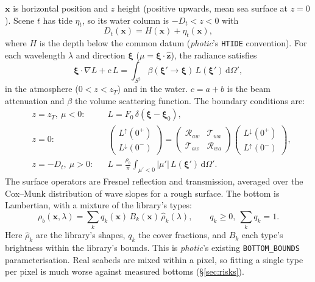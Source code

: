\documentclass[11pt]{article}
\numberwithin{equation}{section}
\newcommand{\bxi}{\boldsymbol{\xi}}
\newcommand{\bx}{\mathbf{x}}
\newcommand{\dd}{\,\mathrm{d}}
\newcommand{\code}[1]{\texttt{#1}}
\begin{document}
$\bx$ is horizontal position and $z$ height (positive upwards, mean sea surface at $z=0$).
Scene $t$ has tide $\eta_t$, so its water column is $-D_t < z < 0$ with
\begin{equation}
D_t(\bx) = H(\bx) + \eta_t(\bx),
\end{equation}
where $H$ is the depth below the common datum (\textit{photic}'s \code{HTIDE} convention). For
each wavelength $\lambda$ and direction $\bxi$ ($\mu = \bxi\cdot\hat{\mathbf z}$), the radiance
satisfies
\begin{equation}\label{eq:rte3d}
\bxi\cdot\nabla L + c\,L = \int_{S^2}\beta(\bxi'\!\to\bxi)\,L(\bxi')\dd\Omega',
\end{equation}
in the atmosphere ($0<z<z_T$) and in the water. $c = a+b$ is the beam attenuation and $\beta$
the volume scattering function. The boundary conditions are:
\begin{align}
&z=z_T,\ \mu<0: && L = F_0\,\delta(\bxi-\bxi_0), \label{eq:bc-toa}\\
&z=0: && \begin{pmatrix} L^{\uparrow}(0^+)\\ L^{\downarrow}(0^-)\end{pmatrix}
  = \begin{pmatrix} \mathcal{R}_{aw} & \mathcal{T}_{wa}\\ \mathcal{T}_{aw} & \mathcal{R}_{wa}\end{pmatrix}
    \begin{pmatrix} L^{\downarrow}(0^+)\\ L^{\uparrow}(0^-)\end{pmatrix}, \label{eq:bc-surf}\\
&z=-D_t,\ \mu>0: && L = \frac{\rho_b}{\pi}\int_{\mu'<0}|\mu'|\,L(\bxi')\dd\Omega'. \label{eq:bc-bot}
\end{align}
The surface operators are Fresnel reflection and transmission, averaged over the Cox--Munk
distribution of wave slopes \cite{coxmunk1954} for a rough surface. The bottom is Lambertian,
with a mixture of the library's types:
\begin{equation}\label{eq:bottom-mix}
\rho_b(\bx,\lambda) = \sum_k q_k(\bx)\,B_k(\bx)\,\hat\rho_k(\lambda), \qquad q_k \ge 0,\ \sum_k q_k = 1.
\end{equation}
Here $\hat\rho_k$ are the library's shapes, $q_k$ the cover fractions, and $B_k$ each type's
brightness within the library's bounds. This is \textit{photic}'s existing \code{BOTTOM\_BOUNDS}
parameterisation. Real seabeds are mixed within a pixel, so fitting a single type per pixel is
much worse against measured bottoms (\S\ref{sec:risks}).
\end{document}
